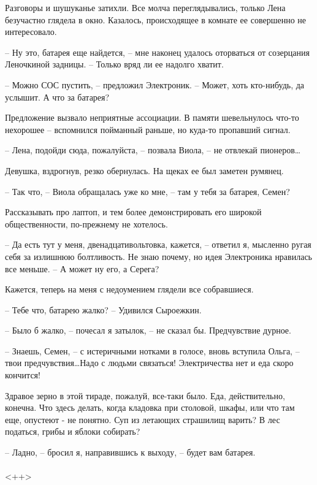 \documentclass[a4paper]{book}
\begin{document}
Разговоры и шушуканье затихли. Все молча переглядывались, только Лена безучастно глядела в окно. Казалось, происходящее в комнате ее совершенно не интересовало. 

-- Ну это, батарея еще найдется, -- мне наконец удалось оторваться от созерцания Леночкиной задницы. -- Только вряд ли ее надолго хватит.

-- Можно СОС пустить, -- предложил Электроник. -- Может, хоть кто-нибудь, да услышит. А что за батарея?

Предложение вызвало неприятные ассоциации. В памяти шевельнулось что-то нехорошее -- вспомнился пойманный раньше, но куда-то пропавший сигнал. 

-- Лена, подойди сюда, пожалуйста, -- позвала Виола, -- не отвлекай пионеров\ldots

Девушка, вздрогнув, резко обернулась. На щеках ее был заметен румянец. 

-- Так что, -- Виола обращалась уже ко мне, -- там у тебя за батарея, Семен? 

Рассказывать про лаптоп, и тем более демонстрировать его широкой общественности, по-прежнему не хотелось. 

-- Да есть тут у меня, двенадцативольтовка, кажется, -- ответил я, мысленно ругая себя за излишнюю болтливость. Не знаю почему, но идея Электроника нравилась все меньше. -- А может ну его, а Серега? 

Кажется, теперь на меня с недоумением глядели все собравшиеся.

-- Тебе что, батарею жалко? -- Удивился Сыроежкин. 

-- Было б жалко, -- почесал я затылок, -- не сказал бы. Предчувствие дурное.

-- Знаешь, Семен, -- с истеричными нотками в голосе, вновь вступила Ольга, -- твои предчувствия\ldots Надо с людьми связаться! Электричества нет и еда скоро кончится!

Здравое зерно в этой тираде, пожалуй, все-таки было. Еда, действительно, конечна. Что здесь делать, когда кладовка при столовой, шкафы, или что там еще, опустеют - не понятно. Суп из летающих страшилищ варить? В лес податься, грибы и яблоки собирать? 

-- Ладно, -- бросил я, направившись к выходу, -- будет вам батарея.

\paragraph{}<++>
\end{document}
